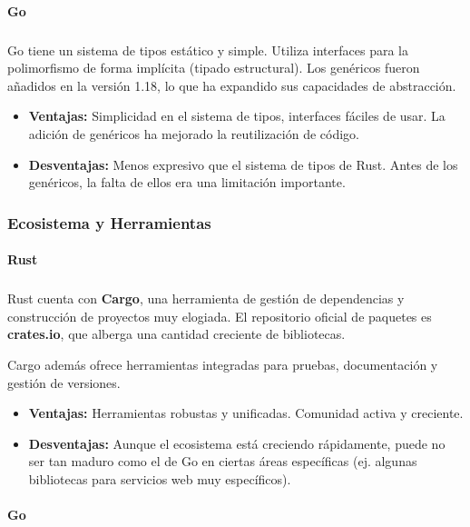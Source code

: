 \paragraph{Go}
\subparagraph{}

Go tiene un sistema de tipos estático y simple. Utiliza interfaces para la polimorfismo de forma implícita (tipado estructural). Los genéricos fueron añadidos en la versión 1.18, lo que ha expandido sus capacidades de abstracción.
\begin{itemize}
    \item \textbf{Ventajas:} Simplicidad en el sistema de tipos, interfaces fáciles de usar. La adición de genéricos ha mejorado la reutilización de código.
    \item \textbf{Desventajas:} Menos expresivo que el sistema de tipos de Rust. Antes de los genéricos, la falta de ellos era una limitación importante.
\end{itemize}

\subsubsection{Ecosistema y Herramientas}
\paragraph{Rust}
\subparagraph{}

Rust cuenta con \textbf{Cargo}, una herramienta de gestión de dependencias y construcción de proyectos muy elogiada. El repositorio oficial de paquetes es \textbf{crates.io}, que alberga una cantidad creciente de bibliotecas.

Cargo además ofrece herramientas integradas para pruebas, documentación y gestión de versiones.
\begin{itemize}
    \item \textbf{Ventajas:} Herramientas robustas y unificadas. Comunidad activa y creciente.
    \item \textbf{Desventajas:} Aunque el ecosistema está creciendo rápidamente, puede no ser tan maduro como el de Go en ciertas áreas específicas (ej. algunas bibliotecas para servicios web muy específicos).
\end{itemize}

\paragraph{Go}
\subparagraph{}

